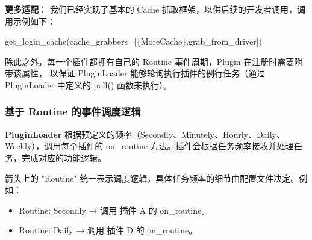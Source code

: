 \documentclass[14pt,a4paper,UTF8,twoside]{article}
\renewcommand{\texttt}[1]{{\color{blue}\ttfamily#1}}
\begin{document}
\begin{rmr}
    \textbf{更多适配}：
    我们已经实现了基本的 Cache 抓取框架，以供后续的开发者调用，调用示例如下：

    \texttt{get\_login\_cache(cache\_grabbers=[\{MoreCache\}.grab\_from\_driver])}
\end{rmr}

除此之外，每一个插件都拥有自己的 Routine 事件周期，Plugin 在注册时需要附带该属性，
以保证 PluginLoader 能够轮询执行插件的例行任务（通过 PluginLoader 中定义的 \texttt{poll()} 函数来执行）。

\subsubsection{基于 Routine 的事件调度逻辑}

\begin{note}
\noindent \textbf{PluginLoader} 根据预定义的频率（Secondly、Minutely、Hourly、Daily、Weekly），调用每个插件的 \texttt{on\_routine} 方法。插件会根据任务频率接收并处理任务，完成对应的功能逻辑。

\vspace{0.3cm}

\noindent 箭头上的 "Routine" 统一表示调度逻辑，具体任务频率的细节由配置文件决定。例如：
\begin{itemize}
    \item \texttt{Routine: Secondly} → 调用 插件 A 的 \texttt{on\_routine}。
    \item \texttt{Routine: Daily} → 调用 插件 D 的 \texttt{on\_routine}。
\end{itemize}
\end{note}

\vspace{0.27cm}
\end{document}

